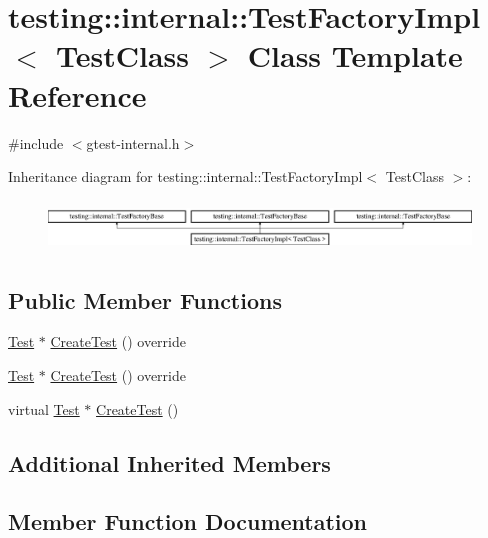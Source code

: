 \hypertarget{classtesting_1_1internal_1_1_test_factory_impl}{}\section{testing\+::internal\+::Test\+Factory\+Impl$<$ Test\+Class $>$ Class Template Reference}
\label{classtesting_1_1internal_1_1_test_factory_impl}


{\ttfamily \#include $<$gtest-\/internal.\+h$>$}

Inheritance diagram for testing\+::internal\+::Test\+Factory\+Impl$<$ Test\+Class $>$\+:\begin{figure}[H]
\begin{center}
\leavevmode
\includegraphics[height=1.347774cm]{df/d14/classtesting_1_1internal_1_1_test_factory_impl}
\end{center}
\end{figure}
\subsection*{Public Member Functions}
\begin{DoxyCompactItemize}
\item 
\mbox{\hyperlink{classtesting_1_1_test}{Test}} $\ast$ \mbox{\hyperlink{classtesting_1_1internal_1_1_test_factory_impl_ab9b9236ef39b14f0a78e611748e970e3}{Create\+Test}} () override
\item 
\mbox{\hyperlink{classtesting_1_1_test}{Test}} $\ast$ \mbox{\hyperlink{classtesting_1_1internal_1_1_test_factory_impl_ab9b9236ef39b14f0a78e611748e970e3}{Create\+Test}} () override
\item 
virtual \mbox{\hyperlink{classtesting_1_1_test}{Test}} $\ast$ \mbox{\hyperlink{classtesting_1_1internal_1_1_test_factory_impl_a8860c89bdb06450a5d5e8137ebd9d775}{Create\+Test}} ()
\end{DoxyCompactItemize}
\subsection*{Additional Inherited Members}


\subsection{Member Function Documentation}
\mbox{\label{classtesting_1_1internal_1_1_test_factory_impl_ab9b9236ef39b14f0a78e611748e970e3}} 
